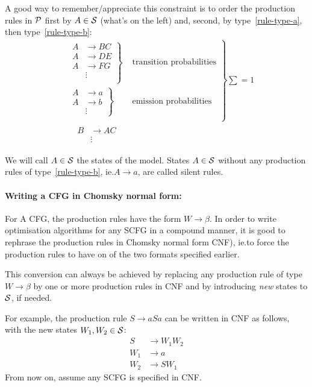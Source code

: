 A good way to remember/appreciate this constraint is to order the production
rules in \(\mathcal{P}\) first by \(A\in\mathcal{S}\) (what's on the left) and, second,
by type~\ref{rule-type-a}, then type~\ref{rule-type-b}:
\begin{align*}
&\left.
\begin{array}{cc}
  \left.
  \begin{array}{cc}
    A &\to BC \\
    A &\to DE \\
    A &\to FG \\
      &\vdots \\
  \end{array}\right\}& \text{ transition probabilities} \\
  \left.
  \begin{array}{cc}
    A &\to a \\
    A &\to b \\
      &\vdots
  \end{array}\right\}& \text{ emission probabilities} \\
\end{array}\right\} \sum = 1 \\
&\quad\begin{array}{cc}
  B &\to AC \\
    &\vdots
\end{array}
\end{align*}

We will call \(A\in\mathcal{S}\) the states of the model.  States \(A\in\mathcal{S}\)
without any production rules of type~\ref{rule-type-b}, ie.\@ \(A\to a\), are
called silent rules.

\paragraph{Writing a CFG in Chomsky normal form:}
For A CFG, the production rules have the form \(W\to\beta\).  In order to write
optimisation algorithms for any SCFG in a compound manner, it is good to
rephrase the production rules in Chomsky normal form CNF), ie.\@ to force the
production rules to have on of the two formats specified earlier.

This conversion can always be achieved by replacing any production rule of type
\(W\to\beta\) by one or more production rules in CNF and by introducing
\emph{new} states to \(\mathcal{S}\), if needed.

For example, the production rule \(S\to aSa\) can be written in CNF as follows,
with the new states \(W_1,W_2\in\mathcal{S}\):
\begin{align}
  S   &\to W_1 W_2 \\
  W_1 &\to a \\
  W_2 &\to SW_1
\end{align}
From now on, assume any SCFG is specified in CNF\@.

